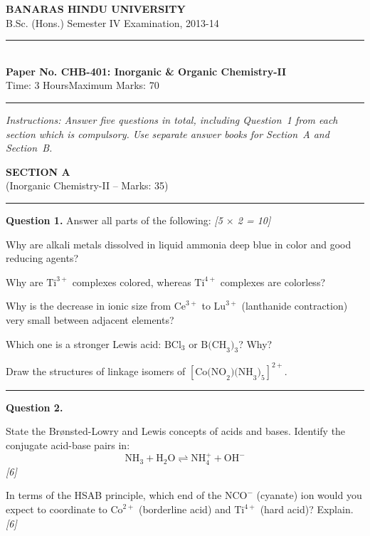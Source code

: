 \documentclass[11pt,a4paper]{article}
\newcommand{\pts}[1]{\hfill   \textit{[#1]}}
\begin{document}
\begin{center}
  {\large\bfseries BANARAS HINDU UNIVERSITY}\\[2pt]
  {\normalsize B.Sc. (Hons.) Semester IV Examination, 2013-14}\\[6pt]
  \rule{0.8\linewidth}{0.5pt}\\[6pt]
  {\large\bfseries Paper No. CHB-401: Inorganic \& Organic Chemistry-II}\\[4pt]
  {\normalsize Time: 3 Hours\hfill Maximum Marks: 70}
\end{center}
\rule{\linewidth}{0.4pt}
\small



\noindent   \textit{Instructions: Answer five questions in total, including Question~1 from each section which is compulsory. Use separate answer books for Section~A and Section~B.}

\normalsize
\bigskip


\begin{center}
  {\large\bfseries SECTION A}\\[2pt]
  {\normalsize (Inorganic Chemistry-II -- Marks: 35)}
\end{center}
\rule{0.4\linewidth}{0.2pt}
\smallskip




\noindent   \textbf{Question 1.} Answer all parts of the following: \pts{5 $ \times$ 2 = 10}

\begin{parts}
  \item Why are alkali metals dissolved in liquid ammonia deep blue in color and good reducing agents?
  \item Why are $ \text{Ti}^{3+}$ complexes colored, whereas $ \text{Ti}^{4+}$ complexes are colorless?
  \item Why is the decrease in ionic size from $ \text{Ce}^{3+}$ to $ \text{Lu}^{3+}$ (lanthanide contraction) very small between adjacent elements?
  \item Which one is a stronger Lewis acid: $ \text{BCl}_3$ or $ \text{B(CH}_3 \text{)}_3$? Why?
  \item Draw the structures of linkage isomers of $[ \text{Co(NO}_2 \text{)(NH}_3 \text{)}_5]^{2+}$.
\end{parts}

\medskip\rule{\linewidth}{0.2pt}




\noindent   \textbf{Question 2.}

\begin{parts}
  \item State the Br\o nsted-Lowry and Lewis concepts of acids and bases. Identify the conjugate acid-base pairs in:
    \[  \text{NH}_3 +  \text{H}_2 \text{O} \rightleftharpoons  \text{NH}_4^+ +  \text{OH}^- \] \pts{6}
  \item In terms of the HSAB principle, which end of the $ \text{NCO}^-$ (cyanate) ion would you expect to coordinate to $ \text{Co}^{2+}$ (borderline acid) and $ \text{Ti}^{4+}$ (hard acid)? Explain. \pts{6}
\end{parts}
\end{document}
